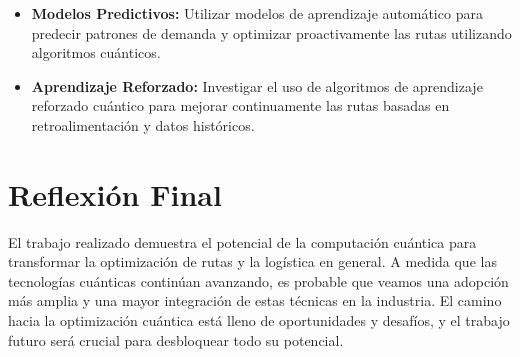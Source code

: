 \documentclass[11pt,a4paper,spanish]{book}
\begin{document}
\begin{itemize}
    \item \textbf{Modelos Predictivos:} Utilizar modelos de aprendizaje automático para predecir patrones de demanda y optimizar proactivamente las rutas utilizando algoritmos cuánticos.
    \item \textbf{Aprendizaje Reforzado:} Investigar el uso de algoritmos de aprendizaje reforzado cuántico para mejorar continuamente las rutas basadas en retroalimentación y datos históricos.
\end{itemize}

\section{Reflexión Final}

El trabajo realizado demuestra el potencial de la computación cuántica para transformar la optimización de rutas y la logística en general. A medida que las tecnologías cuánticas continúan avanzando, es probable que veamos una adopción más amplia y una mayor integración de estas técnicas en la industria. El camino hacia la optimización cuántica está lleno de oportunidades y desafíos, y el trabajo futuro será crucial para desbloquear todo su potencial.
\end{document}
